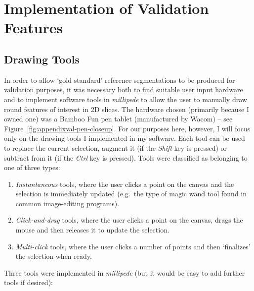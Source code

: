 \chapter{Implementation of Validation Features}
\label{chap:appendixval}

\section{Drawing Tools}



\noindent In order to allow `gold standard' reference segmentations to be produced for validation purposes, it was necessary both to find suitable user input hardware and to implement software tools in \emph{millipede} to allow the user to manually draw round features of interest in 2D slices. The hardware chosen (primarily because I owned one) was a Bamboo Fun pen tablet (manufactured by Wacom) -- see Figure~\ref{fig:appendixval-pen-closeup}. For our purposes here, however, I will focus only on the drawing tools I implemented in my software. Each tool can be used to replace the current selection, augment it (if the \emph{Shift} key is pressed) or subtract from it (if the \emph{Ctrl} key is pressed). Tools were classified as belonging to one of three types:
%
\begin{enumerate}
\item \emph{Instantaneous} tools, where the user clicks a point on the canvas and the selection is immediately updated (e.g.~the type of magic wand tool found in common image-editing programs).
\item \emph{Click-and-drag} tools, where the user clicks a point on the canvas, drags the mouse and then releases it to update the selection.
\item \emph{Multi-click} tools, where the user clicks a number of points and then `finalizes' the selection when ready.
\end{enumerate}

\noindent Three tools were implemented in \emph{millipede} (but it would be easy to add further tools if desired):

